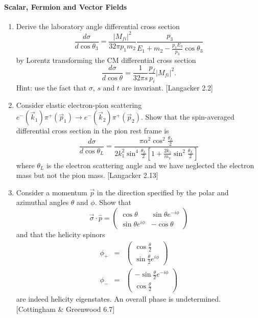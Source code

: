 \documentclass[letterpaper,11pt]{article}
\begin{document}
\paragraph*{Scalar, Fermion and Vector Fields}
\begin{enumerate}
 \item Derive the laboratory angle differential cross section
 \begin{equation*}
  \frac{d\sigma}{d\cos\theta_3} = \frac{|M_{fi}|^2}{32\pi p_1 m_2} \frac{p_3}{E_1 + m_2 - \frac{p_1 E_3}{p_3} \cos\theta_3}
 \end{equation*}
 by Lorentz transforming the CM differential cross section
 \begin{equation*}
  \frac{d\sigma}{d\cos\theta} = \frac{1}{32 \pi s} \frac{p_f}{p_i} |M_{fi}|^2.
 \end{equation*}
 Hint: use the fact that $\sigma$, $s$ and $t$ are invariant. [Langacker 2.2]
 \item Consider elastic electron-pion scattering $e^-(\vec{k}_1) \pi^+(\vec{p}_1) \to e^-(\vec{k}_2) \pi^+(\vec{p}_2)$. Show that the spin-averaged differential cross section in the pion rest frame is
 \begin{equation*}
  \frac{d\sigma}{d\cos\theta_L} = \frac{\pi \alpha^2 \cos^2 \frac{\theta_L}{2}}{2 k_1^2 \sin^4 \frac{\theta_L}{2} \left[ 1 + \frac{2 k_1}{m_\pi} \sin^2 \frac{\theta_L}{2} \right]}
 \end{equation*}
 where $\theta_L$ is the electron scattering angle and we have neglected the electron mass but not the pion mass. [Langacker 2.13]
 \item Consider a momentum $\vec{p}$ in the direction specified by the polar and azimuthal angles $\theta$ and $\phi$. Show that
 \begin{equation*}
  \vec{\sigma} \cdot \hat{p} = \left( \begin{array}{cc} \cos\theta & \sin\theta e^{-i\phi} \\ \sin\theta e^{i\phi} & -\cos\theta \end{array} \right)
 \end{equation*}
 and that the helicity spinors
 \begin{eqnarray*}
  \phi_+ & = & \left( \begin{array}{c} \cos\frac{\theta}{2} \\ \sin\frac{\theta}{2} e^{i\phi} \end{array} \right) \\
  \phi_- & = & \left( \begin{array}{c} -\sin\frac{\theta}{2} e^{-i\phi} \\ \cos\frac{\theta}{2} \end{array} \right)
 \end{eqnarray*}
 are indeed helicity eigenstates. An overall phase is undetermined. [Cottingham \& Greenwood 6.7]
\end{enumerate}
\end{document}
